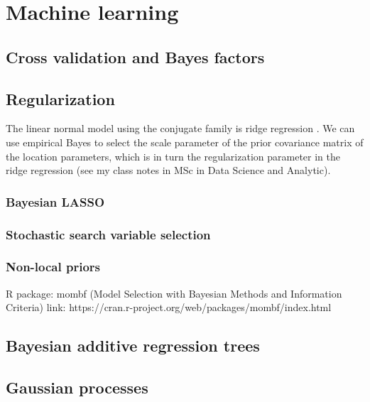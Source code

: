 \chapter{Machine learning}\label{chap13}

\section{Cross validation and Bayes factors}\label{sec13_1}

\section{Regularization}\label{sec13_2}
The linear normal model using the conjugate family is ridge regression \cite{Ishwaran2005}. We can use empirical Bayes to select the scale parameter of the prior covariance matrix of the location parameters, which is in turn the regularization parameter in the ridge regression (see my class notes in MSc in Data Science and Analytic).

\subsection{Bayesian LASSO}\label{sec13_21}

\subsection{Stochastic search variable selection}\label{sec13_22}

\subsection{Non-local priors}\label{sec13_23}

\cite{johnson2012bayesian}
R package: mombf (Model Selection with Bayesian Methods and Information Criteria)
link: https://cran.r-project.org/web/packages/mombf/index.html

\section{Bayesian additive regression trees}\label{sec13_3}

\section{Gaussian processes}\label{13_4}